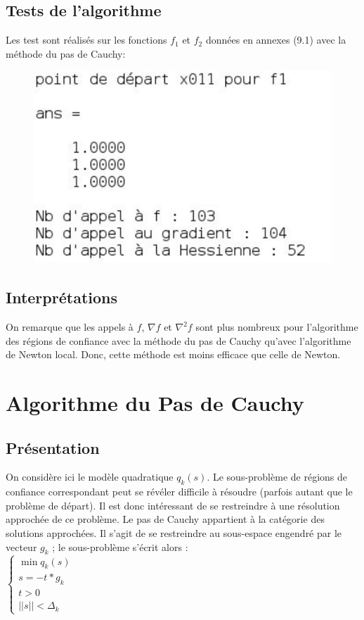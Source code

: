 \documentclass[a4paper,12pt]{article}
\theoremstyle{break}
\begin{document}
\subsection{Tests de l'algorithme}
Les test sont réalisés sur les fonctions $f_1$ et $f_2$ données en annexes (9.1) avec la méthode du pas de Cauchy:
\begin{figure}[htbp]
	\centering
		\includegraphics{img/test1_region.PNG}
\end{figure}

\subsection{Interprétations}

On remarque que les appels à $f$, $\nabla f$ et $\nabla^2 f$ sont plus nombreux pour l'algorithme des régions de confiance avec la méthode du pas de Cauchy qu'avec l'algorithme de Newton local. Donc, cette méthode est moins efficace que celle de Newton.

\newpage

\section{Algorithme du Pas de Cauchy}
\subsection{Présentation}

On considère ici le modèle quadratique $q_k(s)$. Le sous-problème de régions de confiance
correspondant peut se révéler difficile à résoudre (parfois autant que le problème de départ).
Il est donc intéressant de se restreindre à une résolution approchée de ce problème.
Le pas de Cauchy appartient à la catégorie des solutions approchées. Il s'agit de se
restreindre au sous-espace engendré par le vecteur $g_k$ ; le sous-problème s'écrit alors :\\
$\begin{cases}
			\min q_k(s) \\
			s = -t*g_k\\
			t > 0 \\
			||s||< \Delta_k
		\end{cases}$
\end{document}
